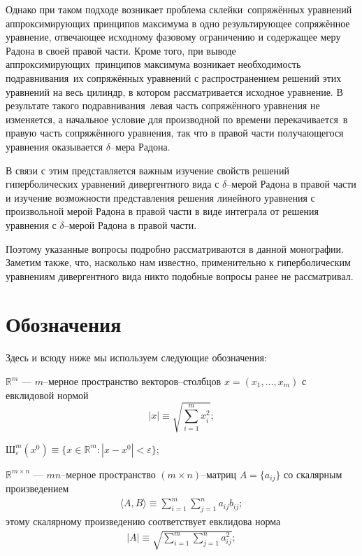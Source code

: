 \documentclass{report}
\begin{document}
Однако при таком подходе возникает проблема \glqq склейки\grqq\ сопряжённых уравнений аппроксимирующих принципов максимума в одно результирующее сопряжённое уравнение, отвечающее исходному
фазовому ограничению и содержащее меру Радона в своей правой части. Кроме того, при выводе \glqq аппроксимирующих\grqq\ принципов максимума возникает необходимость
\glqq подравнивания\grqq\ их сопряжённых уравнений с распространением решений этих уравнений на весь цилиндр, в котором рассматривается исходное уравнение. В результате такого
\glqq подравнивания\grqq\ левая часть сопряжённого уравнения не изменяется, а начальное условие для производной по времени \glqq перекачивается\grqq\ в правую часть сопряжённого уравнения,
так что в правой части получающегося уравнения оказывается $\delta$--мера Радона.

В связи с этим представляется важным изучение свойств решений гиперболических уравнений дивергентного вида с $\delta$--мерой Радона в правой части и изучение возможности представления
решения линейного уравнения с произвольной мерой Радона в правой части в виде интеграла от решения уравнения с $\delta$--мерой Радона в правой части.

Поэтому указанные вопросы подробно рассматриваются в данной монографии. Заметим также, что, насколько нам известно, применительно к гиперболическим уравнениям дивергентного вида никто
подобные вопросы ранее не рассматривал.

        \section*{Обозначения}
Здесь и всюду ниже мы используем следующие обозначения:

$\mathbb{R}^m$ --- $m$--мерное пространство векторов--столбцов $x=(x_1,\dots,x_m)$ с евклидовой нормой
$$|x|\equiv\sqrt{\sum\limits_{i=1}^mx_i^2};$$

$\text{Ш}^m_\varepsilon(x^0)\equiv\{x\in\mathbb{R}^m:|x-x^0|<\varepsilon\}$;

$\mathbb{R}^{m\times n}$ --- $mn$--мерное пространство $(m\times n)$--матриц $A=\{a_{ij}\}$ со скалярным произведением
\begin{gather*}
\langle A,B\rangle\equiv\sum\limits_{i=1}^m\sum\limits_{j=1}^na_{ij}b_{ij};
\end{gather*}
этому скалярному произведению соответствует евклидова норма
\begin{gather*}
|A|\equiv\sqrt{\sum\limits_{i=1}^m\sum\limits_{j=1}^na_{ij}^2};
\end{gather*}
\end{document}
